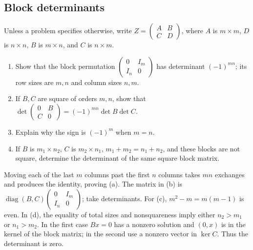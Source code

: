 \subsection*{Block determinants}
Unless a problem specifies otherwise, write
\(Z=\begin{pmatrix}A&B\\C&D\end{pmatrix}\), where \(A\) is \(m\times m\),
\(D\) is \(n\times n\), \(B\) is \(m\times n\), and \(C\) is \(n\times m\).

\begin{problem}\label{ex:07:block-swap}
\begin{enumerate}
\item Show that the block permutation
\(\begin{pmatrix}0&I_m\\I_n&0\end{pmatrix}\) has determinant
\((-1)^{mn}\); its row sizes are \(m,n\) and column sizes \(n,m\).
\item If \(B,C\) are square of orders \(m,n\), show that
\(\det\begin{pmatrix}0&B\\C&0\end{pmatrix}
=(-1)^{mn}\det B\det C\).
\item Explain why the sign is \((-1)^m\) when \(m=n\).
\item If \(B\) is \(m_1\times n_2\), \(C\) is \(m_2\times n_1\),
\(m_1+m_2=n_1+n_2\), and these blocks are not square, determine the
determinant of the same square block matrix.
\end{enumerate}
\end{problem}
\begin{solution}
Moving each of the last \(m\) columns past the first \(n\) columns
takes \(mn\) exchanges and produces the identity, proving (a).
The matrix in (b) is
\(\operatorname{diag}(B,C)\begin{pmatrix}0&I_m\\I_n&0\end{pmatrix}\);
take determinants. For (c), \(m^2-m=m(m-1)\) is even.
In (d), the equality of total sizes and nonsquareness imply either
\(n_2>m_1\) or \(n_1>m_2\).
In the first case \(Bx=0\) has a nonzero solution and \((0,x)\) is in
the kernel of the block matrix; in the second use a nonzero vector in
\(\ker C\). Thus the determinant is zero.
\end{solution}

